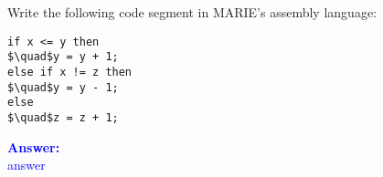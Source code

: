 \item{}
Write the following code segment in MARIE’s assembly language:
\begin{lstlisting}
if x <= y then
$\quad$y = y + 1;
else if x != z then
$\quad$y = y - 1;
else
$\quad$z = z + 1;
\end{lstlisting}
\vskip12pt
\ifanswers
\textcolor{blue}{
\textbf{Answer:}\\
answer
}
\newpage
\fi

